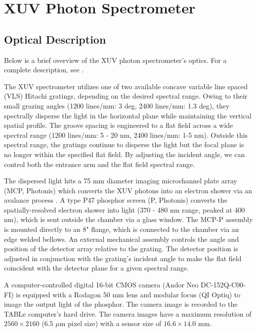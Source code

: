 \section{XUV Photon Spectrometer}
\label{sec:XUV_spectrometer}

\subsection{Optical Description}

Below is a brief overview of the XUV photon spectrometer's optics. For a complete description, see \cite{hagemanComplexAttosecondTransientAbsorption2020}.

The XUV spectrometer utilizes one of two available concave variable line spaced (VLS) Hitachi gratings, depending on the desired spectral range. Owing to their small grazing angles (1200 lines/mm: 3 deg, 2400 lines/mm: 1.3 deg), they spectrally disperse the light in the horizontal plane while maintaining the vertical spatial profile. The groove spacing is engineered to a flat field across a wide spectral range (1200 lines/mm: 5 - 20 nm, 2400 lines/mm: 1-5 nm). Outside this spectral range, the gratings continue to disperse the light but the focal plane is no longer within the specified flat field. By adjusting the incident angle, we can control both the entrance arm and the flat field spectral range.

The dispersed light hits a 75 mm diameter imaging microchannel plate array (MCP, Photonis) which converts the XUV photons into an electron shower via an avalance process \cite{ladislaswizaMicrochannelPlateDetectors1979a,fraserGrayImagingUsing1984}. A type P47 phosphor screen (P, Photonis) converts the spatially-resolved electron shower into light (370 - 480 nm range, peaked at 400 nm), which is sent outside the chamber via a glass window. The MCP-P assembly is mounted directly to an 8" flange, which is connected to the chamber via an edge welded bellows. An external mechanical assembly controls the angle and position of the detector array relative to the grating. The detector position is adjusted in conjunction with the grating's incident angle to make the flat field coincident with the detector plane for a given spectral range.

A computer-controlled digital 16-bit CMOS camera (Andor Neo DC-152Q-C00-FI) is equipped with a Rodagon 50 mm lens and modular focus (QI Optiq) to image the output light of the phosphor. The camera image is recorded to the TABLe computer's hard drive. The camera images have a maximum resolution of $2560 \times 2160$ (6.5 $\mu$m pixel size) with a sensor size of $16.6 \times 14.0$ mm.

